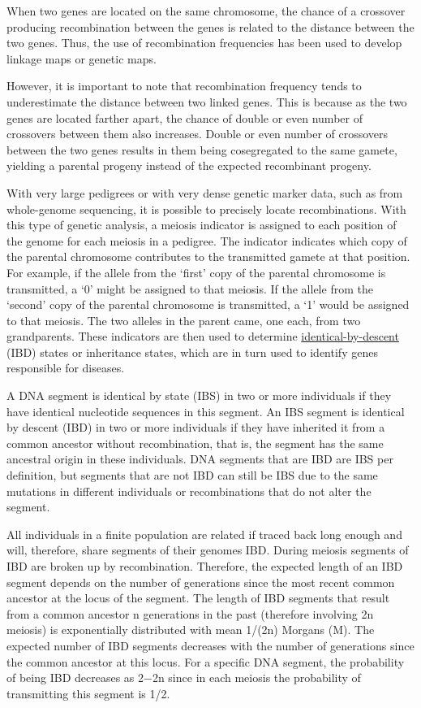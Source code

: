 When two genes are located on the same chromosome, the chance of a crossover producing recombination between the genes is related to the distance between the two genes. Thus, the use of recombination frequencies has been used to develop linkage maps or genetic maps.

However, it is important to note that recombination frequency tends to underestimate the distance between two linked genes. This is because as the two genes are located farther apart, the chance of double or even number of crossovers between them also increases. Double or even number of crossovers between the two genes results in them being cosegregated to the same gamete, yielding a parental progeny instead of the expected recombinant progeny.

With very large pedigrees or with very dense genetic marker data, such as from whole-genome sequencing, it is possible to precisely locate recombinations. With this type of genetic analysis, a meiosis indicator is assigned to each position of the genome for each meiosis in a pedigree. The indicator indicates which copy of the parental chromosome contributes to the transmitted gamete at that position. For example, if the allele from the `first' copy of the parental chromosome is transmitted, a `0' might be assigned to that meiosis. If the allele from the `second' copy of the parental chromosome is transmitted, a `1' would be assigned to that meiosis. The two alleles in the parent came, one each, from two grandparents. These indicators are then used to determine \href{https://en.wikipedia.org/wiki/Identity_by_descent}{identical-by-descent} (IBD) states or inheritance states, which are in turn used to identify genes responsible for diseases.

A DNA segment is identical by state (IBS) in two or more individuals if they have identical nucleotide sequences in this segment. An IBS segment is identical by descent (IBD) in two or more individuals if they have inherited it from a common ancestor without recombination, that is, the segment has the same ancestral origin in these individuals. DNA segments that are IBD are IBS per definition, but segments that are not IBD can still be IBS due to the same mutations in different individuals or recombinations that do not alter the segment.

All individuals in a finite population are related if traced back long enough and will, therefore, share segments of their genomes IBD. During meiosis segments of IBD are broken up by recombination. Therefore, the expected length of an IBD segment depends on the number of generations since the most recent common ancestor at the locus of the segment. The length of IBD segments that result from a common ancestor n generations in the past (therefore involving 2n meiosis) is exponentially distributed with mean 1/(2n) Morgans (M). The expected number of IBD segments decreases with the number of generations since the common ancestor at this locus. For a specific DNA segment, the probability of being IBD decreases as 2−2n since in each meiosis the probability of transmitting this segment is 1/2.

